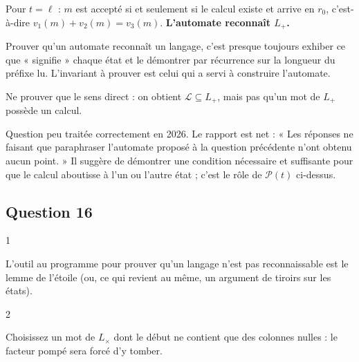 \documentclass[11pt,a4paper]{article}
\begin{document}
Pour \(t=\ell\) : \(m\) est accepté si et seulement si le calcul existe et arrive en \(r_0\), c'est-à-dire \(v_1(m)+v_2(m)=v_3(m)\). \textbf{L'automate reconnaît \(L_+\).}

\begin{methode}

Prouver qu'un automate reconnaît un langage, c'est presque toujours exhiber ce que « signifie » chaque état et le démontrer par récurrence sur la longueur du préfixe lu. L'invariant à prouver est celui qui a servi à construire l'automate.

\end{methode}

\begin{piege}

Ne prouver que le sens direct : on obtient \(\mathcal{L}\subseteq L_+\), mais pas qu'un mot de \(L_+\) possède un calcul.

\end{piege}

\begin{jury}

Question peu traitée correctement en 2026. Le rapport est net : « Les réponses ne faisant que paraphraser l'automate proposé à la question précédente n'ont obtenu aucun point. » Il suggère de démontrer une condition nécessaire et suffisante pour que le calcul aboutisse à l'un ou l'autre état ; c'est le rôle de \(\mathcal{P}(t)\) ci-dessus.

\end{jury}

\hypertarget{question-16}{%
\subsection{Question 16}\label{question-16}}

\begin{indication}{1}

L'outil au programme pour prouver qu'un langage n'est pas reconnaissable est le lemme de l'étoile (ou, ce qui revient au même, un argument de tiroirs sur les états).

\end{indication}

\begin{indication}{2}

Choisissez un mot de \(L_\times\) dont le début ne contient que des colonnes nulles : le facteur pompé sera forcé d'y tomber.

\end{indication}
\end{document}

